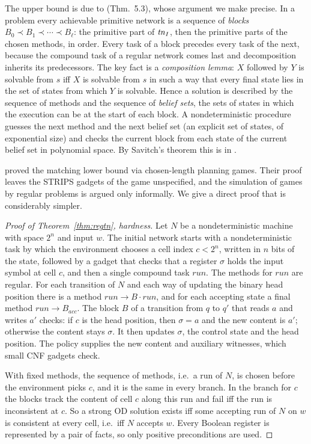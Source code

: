 The upper bound is due to \CBa{} (Thm.~5.3), whose argument we make precise. In a \REGtn{} problem
every achievable primitive network is a sequence of \emph{blocks} $B_0\prec B_1\prec\cdots\prec
B_\ell$: the primitive part of $\mathit{tn}_I$, then the primitive parts of the chosen methods, in order.
Every task of a block precedes every task of the next, because the compound task of a regular
network comes last and decomposition inherits its predecessors. The key fact is a
\emph{composition lemma}: $X$ followed by $Y$ is solvable from $s$ iff $X$ is solvable from $s$
in such a way that every final state lies in the set of states from which $Y$ is solvable. Hence
a solution is described by the sequence of methods and the sequence of \emph{belief sets}, the sets
of states in which the execution can be at the start of each block. A nondeterministic procedure
guesses the next method and the next belief set (an explicit set of states, of exponential size)
and checks the current block from each state of the current belief set in polynomial space. By
Savitch's theorem this is in \EXPSPACE.

\DB{} proved the matching lower bound via chosen-length planning games. Their proof leaves the
STRIPS gadgets of the game unspecified, and the simulation of games by regular problems is argued
only informally. We give a direct proof that is considerably simpler.

\begin{proof}[Proof of Theorem~\ref{thm:regtn}, hardness]
  Let $N$ be a nondeterministic machine with space $2^n$ and input $w$. The initial network starts
  with a nondeterministic task by which the environment chooses a cell index $c<2^n$, written in
  $n$ bits of the state, followed by a gadget that checks that a register $\sigma$ holds the input
  symbol at cell $c$, and then a single compound task $\mathit{run}$. The methods for
  $\mathit{run}$ are regular. For each transition of $N$ and each way of updating the binary head
  position there is a method $\mathit{run}\to B\cdot\mathit{run}$, and for each accepting state a
  final method $\mathit{run}\to B_{\mathit{acc}}$. The block $B$ of a transition from $q$ to $q'$
  that reads $a$ and writes $a'$ checks: if $c$ is the head position, then $\sigma=a$ and the new
  content is $a'$; otherwise the content stays $\sigma$. It then updates $\sigma$, the control
  state and the head position. The policy supplies the new content and auxiliary witnesses, which
  small CNF gadgets check.

  With fixed methods, the sequence of methods, i.e.\ a run of $N$, is chosen before the environment
  picks $c$, and it is the same in every branch. In the branch for $c$ the blocks track the
  content of cell $c$ along this run and fail iff the run is inconsistent at $c$. So a strong OD
  solution exists iff some accepting run of $N$ on $w$ is consistent at every cell, i.e.\ iff $N$
  accepts $w$. Every Boolean register is represented by a pair of facts, so only positive
  preconditions are used.
\end{proof}

